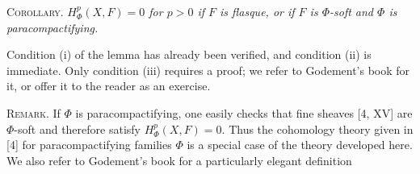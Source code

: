 \indent\textsc{Corollary.} \textit{$H^p_\Phi(X,F)=0$ for $p>0$ if $F$ is
flasque, or if $F$ is $\Phi$-soft and $\Phi$ is paracompactifying.}

Condition (i) of the lemma has already been verified, and condition (ii) is
immediate. Only condition (iii) requires a proof; we refer to Godement's book
for it, or offer it to the reader as an exercise.

\indent\textsc{Remark.} If $\Phi$ is paracompactifying, one easily checks that
fine sheaves [4, XV] are $\Phi$-soft and therefore satisfy
$H^p_\Phi(X,F)=0$. Thus the cohomology theory given in [4] for
paracompactifying families $\Phi$ is a special case of the theory developed
here. We also refer to Godement's book for a particularly elegant definition


